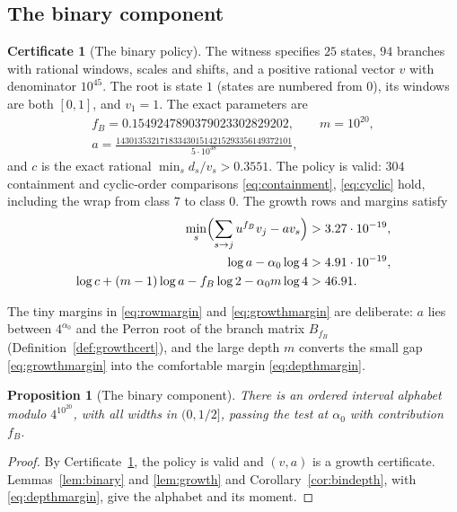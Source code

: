 \documentclass[11pt]{article}
\newtheorem{proposition}[theorem]{Proposition}
\theoremstyle{definition}
\newtheorem{certificate}[theorem]{Certificate}
\theoremstyle{remark}
\newcommand{\al}{\alpha_0}
\begin{document}
\subsection{The binary component}
\begin{certificate}[The binary policy]\label{cert:binary}
The witness specifies $25$ states, $94$ branches with rational windows,
scales and shifts, and a positive rational vector $v$ with denominator
$10^{45}$. The root is state $1$ (states are numbered from $0$), its windows are both
$[0,1]$, and $v_1=1$. The exact parameters are
\begin{gather*}
 f_B=0.1549247890379023302829202,\qquad m=10^{20},\\
 a=\frac{1430135321718334301514215293356149372101}{5\cdot10^{38}},
\end{gather*}
and $c$ is the exact rational $\min_sd_s/v_s>0.3551$. The policy is valid:
$304$ containment and cyclic-order comparisons \eqref{eq:containment},
\eqref{eq:cyclic} hold, including the wrap from class $7$ to class $0$. The
growth rows and margins satisfy
\begin{align}
 \min_s\Bigl(\sum_{s\to j}u^{f_B}v_j-av_s\Bigr)
       &>3.27\cdot10^{-19},\label{eq:rowmargin}\\
 \log a-\al\log4&>4.91\cdot10^{-19},\label{eq:growthmargin}\\
 \log c+(m-1)\log a-f_B\log2-\al m\log4
       &>46.91.\label{eq:depthmargin}
\end{align}
\end{certificate}
The tiny margins in \eqref{eq:rowmargin} and \eqref{eq:growthmargin} are
deliberate: $a$ lies between $4^{\al}$ and the Perron root of the branch
matrix $B_{f_B}$ (Definition~\ref{def:growthcert}), and the large depth $m$ converts the small gap
\eqref{eq:growthmargin} into the comfortable margin \eqref{eq:depthmargin}.

\begin{proposition}[The binary component]\label{prop:binary}
There is an ordered interval alphabet modulo $4^{10^{20}}$, with all widths in
$(0,1/2]$, passing the test at $\al$ with contribution $f_B$.
\end{proposition}
\begin{proof}
By Certificate~\ref{cert:binary}, the policy is valid and $(v,a)$ is a growth
certificate. Lemmas~\ref{lem:binary} and \ref{lem:growth} and
Corollary~\ref{cor:bindepth}, with \eqref{eq:depthmargin}, give the
alphabet and its moment.
\end{proof}
\end{document}
